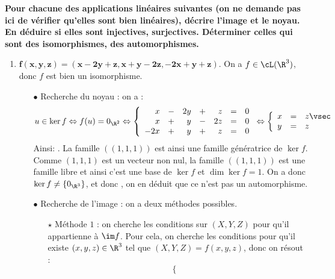 \documentclass[a4paper, 11pt,reqno]{article}
\begin{document}
\begin{correction}  \;
	\textbf{Pour chacune des applications lin\'eaires suivantes (on ne demande pas ici de v\'erifier qu'elles sont bien lin\'eaires), d\'ecrire l'image et le noyau. En d\'eduire si elles sont injectives, surjectives. D\'eterminer celles qui sont des isomorphismes, des automorphismes.}
	\begin{enumerate}
		\item $\mathbf{f(x,y,z)=(x-2y+z,x+y-2z,-2x+y+z)}$. On a $f \in \cL(\R^3)$, donc $f$ est bien un isomorphisme.
		      \begin{itemize}
			      \item[$\bullet$] Recherche du noyau : on a :
			            $$u\in\ker f  \Leftrightarrow  f(u)=0_{\R^2} \Leftrightarrow  \left\lbrace
				            \begin{array}{rcrcrcl}
					            x   & - & 2y & + & z  & = & 0 \\
					            x   & + & y  & - & 2z & = & 0 \\
					            -2x & + & y  & + & z  & = & 0
				            \end{array} \right.
				            \Leftrightarrow
				            \left\lbrace \begin{array}{lll}
					            x & = & z\vsec \\
					            y & = & z
				            \end{array} \right.$$
			            Ainsi: . La famille $((1,1,1))$ est ainsi une famille g\'en\'eratrice de $\ker f$. Comme $(1,1,1)$ est un vecteur non nul, la famille $((1,1,1))$ est une famille libre et ainsi c'est une base de $\ker f$ et $\dim \ker f=1$. On a donc $\ker f \not= \{0_{\R^3}\}$, et donc , on en d\'eduit que ce n'est pas un automorphisme.
			      \item[$\bullet$] Recherche de l'image : on a deux m\'ethodes possibles.
			            \begin{itemize}
				            \item[$\star$] M\'ethode $1$ : on cherche les conditions sur $(X,Y,Z)$ pour qu'il appartienne \`a $\im f$. Pour cela, on cherche les conditions pour qu'il existe $(x,y,z) \in \R^3$ tel que $(X,Y,Z) = f(x,y,z)$, donc on r\'esout :
				                  $$\left\lbrace
					                  \begin{array}{rcrcrcl}

\end{array}$$
\end{itemize}
\end{itemize}
\end{enumerate}
\end{correction}
\end{document}
